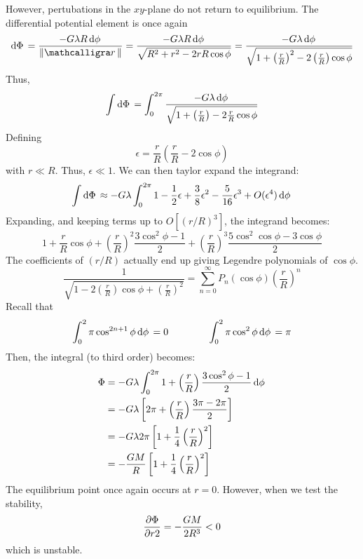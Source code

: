 However, pertubations in the \(xy\)-plane do not return to equilibrium.
The differential potential element is once again
\[\d\Phi = \frac{-G\lambda R\d\phi}{\norm{\sr}}=\frac{-G\lambda R\d\phi}{\sqrt{R^2+r^2-2rR\cos\phi}}=\frac{-G\lambda\d\phi}{\sqrt{1+\left(\frac{r}{R}\right)^2-2\left(\frac{r}{R}\right)\cos\phi}}\]
Thus, 
\[\int\d\Phi=\int_0^{2\pi}\frac{-G\lambda \d\phi}{\sqrt{1+\left(\frac{r}{R}\right) -2 \frac{r}{R}\cos\phi}}\]
Defining
\[\epsilon = \frac{r}{R}\left(\frac{r}{R} - 2\cos\phi\right)\]
with \(r\ll R\). Thus, \(\epsilon\ll 1\). We can then taylor expand the integrand:
\[\int\d\Phi\approx-G\lambda\int_0^{2\pi} 1-\frac{1}{2}\epsilon+\frac{3}{8}\epsilon^2-\frac{5}{16}\epsilon^3+O(\epsilon^4)\d\phi\]
Expanding, and keeping terms up to \(O[(r/R)^3]\), the integrand becomes:
\[1+\frac{r}{R}\cos\phi + \left(\frac{r}{R}\right)^2\frac{3\cos^2\phi - 1}{2} + \left(\frac{r}{R}\right)^3\frac{5\cos^2\cos\phi - 3\cos\phi}{2}\]
The coefficients of \((r/R)\) actually end up giving Legendre polynomials of \(\cos\phi\).
\begin{equation}
\frac{1}{\sqrt{1 - 2\left(\frac{r}{R}\right)\cos\phi + \left(\frac{r}{R}\right)^2}} = \sum_{n=0}^\infty P_n(\cos\phi)\left(\frac{r}{R}\right)^n
\end{equation}
Recall that
\[\int_0^2\pi \cos^{2n+1}\phi\d\phi=0\qquad \qquad \int_0^2\pi \cos^2\phi\d\phi = \pi\]
Then, the integral (to third order) becomes:
\begin{align*}
	\Phi &= -G\lambda \int_0^{2\pi}1+\left(\frac{r}{R}\right)\frac{3\cos^2\phi-1}{2}\d\phi\\
	&=-G\lambda \left[2\pi +\left(\frac{r}{R}\right)\frac{3\pi-2\pi}{2}\right]\\
	&=-G\lambda 2\pi\left[1+\frac{1}{4}\left(\frac{r}{R}\right)^2\right]\\
	&=-\frac{GM}{R}\left[1+\frac{1}{4}\left(\frac{r}{R}\right)^2\right]
\end{align*}
The equilibrium point once again occurs at \(r=0\). However, when we test the stability,
\[\frac{\partial \Phi}{\partial r2}=-\frac{GM}{2R^3}<0\]
which is unstable.


